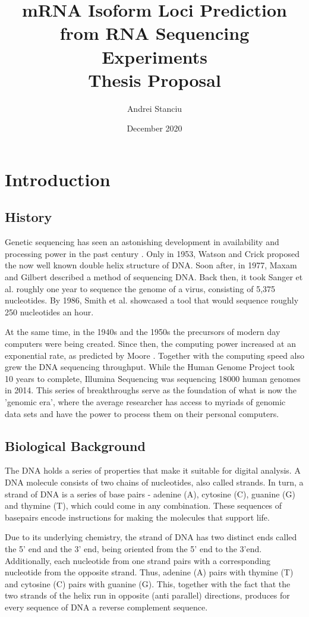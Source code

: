\documentclass[12pt]{article}
\title{%
    mRNA Isoform Loci Prediction from RNA Sequencing Experiments \\
    \large Thesis Proposal}
\author{Andrei Stanciu}
\date{December 2020}
\begin{document}
\maketitle

\section{Introduction}


\subsection{History}
Genetic sequencing has seen an astonishing development in availability and processing power in the past century
\cite{Hood2003}. Only in 1953, Watson and Crick \cite{WATSON1953} proposed the now well known double helix structure of DNA. Soon after, in 1977, Maxam and Gilbert \cite{Maxam1977} described a method of sequencing DNA. Back then, it took Sanger et al. \cite{Sanger1977} roughly one year to sequence the genome of a virus, consisting of 5,375 nucleotides. By 1986, Smith et al. \cite{Smith1986} showcased a tool that would sequence roughly 250 nucleotides an hour. 

At the same time, in the 1940s and the 1950s the precursors of modern day computers were being created. Since then, the computing power increased at an exponential rate, as predicted by Moore \cite{Moore2006}. Together with the computing speed also grew the DNA sequencing throughput. While the Human Genome Project took 10 years to complete, Illumina Sequencing \cite{illuminaSeq} was sequencing 18000 human genomes in 2014. This series of breakthroughs serve as the foundation of what is now the 'genomic era', where the average researcher has access to myriads of genomic data sets and have the power to process them on their personal computers.   

\subsection{Biological Background}
The DNA holds a series of properties that make it suitable for digital analysis. A DNA molecule consists of two chains of nucleotides, also called strands. In turn, a strand of DNA is a series of  base pairs - adenine (A), cytosine (C), guanine (G) and thymine (T), which could come in any combination. These sequences of basepairs encode instructions for making the molecules that support life. 


Due to its underlying chemistry, the strand of DNA has two distinct ends called the 5' end and the 3' end, being oriented from the 5' end to the 3'end. Additionally, each nucleotide from one strand pairs with a corresponding nucleotide from the opposite strand. Thus, adenine (A) pairs with thymine (T) and cytosine (C) pairs with guanine (G). This, together with the fact that the two strands of the helix run in opposite (anti parallel) directions, produces for every sequence of DNA a reverse complement sequence. 
\end{document}
